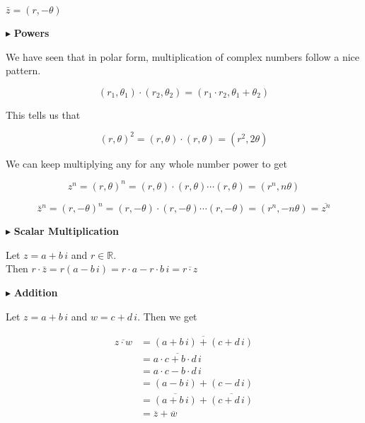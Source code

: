 \documentclass{ximera}
\begin{document}
$\bar{z} = (r, -\theta)$




$\blacktriangleright$ \textbf{Powers}



We have seen that in polar form, multiplication of complex numbers follow a nice pattern.


\[   (r_1, \theta_1) \cdot (r_2, \theta_2) = (r_1 \cdot r_2, \theta_1 + \theta_2)                \]



This tells us that 


\[   (r, \theta)^2 =  (r, \theta) \cdot (r, \theta) = (r^2, 2\theta)                \]



We can keep multiplying any for any whole number power to get 


\[   z^n = (r, \theta)^n =  (r, \theta) \cdot (r, \theta) \cdots (r, \theta)= (r^n, n\theta)                \]




\[   \bar{z}^n = (r, -\theta)^n =  (r, -\theta) \cdot (r, -\theta) \cdots (r, -\theta)= (r^n, -n\theta)  = \overline{z^n}              \]









$\blacktriangleright$ \textbf{Scalar Multiplication}


Let $z = a + b \, i$  and $r \in \mathbb{R}$. \\

Then $r \cdot \bar{z} = r(a - b \, i) = r \cdot a - r \cdot b \, i = \overline{r \cdot z}$







$\blacktriangleright$ \textbf{Addition}


Let $z = a + b \, i$ and $w = c + d \, i$.  Then we get


\begin{align*}
\overline{z \cdot w} & = \overline{(a + b \, i) + (c + d \, i)}  \\
                & = \overline{a \cdot c + b \cdot d \, i}   \\
                & = a \cdot c - b \cdot d \, i   \\
                & = (a - b \, i) + (c - d \, i)   \\
                & = \overline{(a + b \, i)} + \overline{(c + d \, i)}  \\
                & = \overline{z} + \overline{w}
\end{align*}
\end{document}

